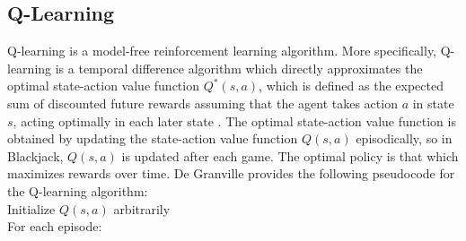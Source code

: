 





\subsection{Q-Learning}
Q-learning is a model-free reinforcement learning algorithm. More specifically, Q-learning is a temporal difference algorithm which directly approximates the optimal state-action value function $Q^* (s,a)$, which is defined as the expected sum of discounted future rewards assuming that the agent takes action $a$ in state $s$, acting optimally in each later state \cite{rn}. The optimal state-action value function is obtained by updating the state-action value function $Q(s,a)$ episodically, so in Blackjack, $Q(s,a)$ is updated after each game. The optimal policy is that which maximizes rewards over time. De Granville provides the following pseudocode for the Q-learning algorithm: \\ 

    \noindent Initialize $Q(s,a)$ arbitrarily \\
    
    \noindent For each episode: \
    
